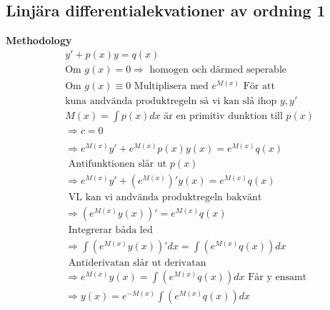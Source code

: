 \begin{multicols}{2}
\subsection{Linjära differentialekvationer av ordning 1}
\textbf{Methodology}  
\begin{align*}
  &y'+p(x)y = q(x)  \\
  &\text{Om } g(x)=0 \Rightarrow \text{ homogen och därmed seperable} \\
  &\text{Om } g(x)\equiv0 \text{ Multiplisera med } e^{M(x)} \text{ För att} \\ 
  &\text{kuna andvända produktregeln så vi kan slå ihop } y, y' \\ 
  &M(x)= \int p(x)dx \text{ är en primitiv dunktion till } p(x) \\
  &\Rightarrow c=0 \\
  &\\
  &\Rightarrow e^{M(x)}y'+e^{M(x)}p(x)y(x) = e^{M(x)}q(x) \\
  &\text{ Antifunktionen slår ut } p(x) \\
  &\Rightarrow e^{M(x)}y'+(e^{M(x)})'y(x) = e^{M(x)}q(x) \\
  &\text{ VL kan vi andvända produktregeln bakvänt} \\
  &\Rightarrow (e^{M(x)}y(x))' = e^{M(x)}q(x) \\
  &\text{ Integrerar båda led} \\
  &\Rightarrow \int(e^{M(x)}y(x))'dx = \int(e^{M(x)}q(x))dx \\
  &\text{ Antiderivatan slår ut derivatan } \\
  &\Rightarrow e^{M(x)}y(x) = \int(e^{M(x)}q(x))dx \text{ Får y ensamt } \\
  &\Rightarrow y(x) = e^{-M(x)} \int(e^{M(x)}q(x))dx
\end{align*}


\end{multicols}
